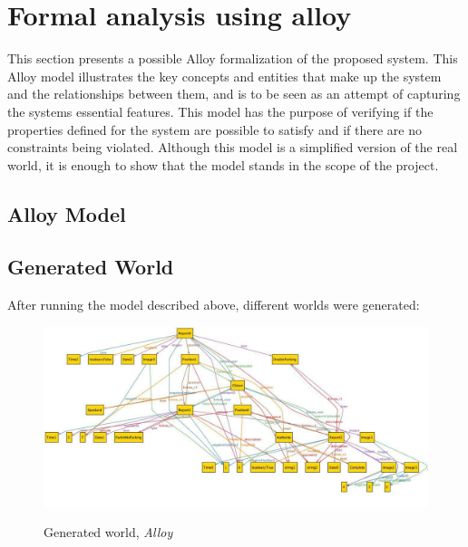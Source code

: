 \documentclass[../RASD.tex]{subfiles}
\begin{document}
    \chapter{Formal analysis using alloy }\label{ch:formal-analysis-using-alloy}
    This section presents a possible Alloy formalization of the proposed system.
    This Alloy model illustrates the key concepts and entities that make up the system and the relationships
    between them, and is to be seen as an attempt of capturing the systems essential features.
    This model has the purpose of verifying if the properties defined for the system are possible to satisfy and if there are no constraints being violated.
    Although this model is a simplified version of the real world, it is enough to show that the model stands in the scope of the project.

    \section{Alloy Model}\label{sec:alloy-model}
        \vspace{2 mm}
        
        \vspace{8 mm}

    \section{Generated World}\label{sec:generated-world}
    After running the model described above, different worlds were generated:
    \begin{figure}[H]
        \centering
        \includegraphics[scale = 0.8]{assets/generatedWorld1.png}\\[1.6 cm]
        \caption[Generated world, \textit{Alloy}]{Generated world, \textit{Alloy}}
    \end{figure}
\end{document}
